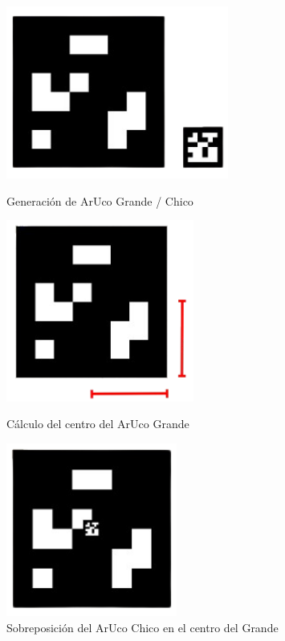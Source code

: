     \begin{figure}[h!]
        \centering
        \begin{minipage}{0.3\textwidth}
            \centering
            \includegraphics[width=0.65\textwidth]{pictures/pose_1.png}
            \caption{Generación de ArUco Grande / Chico}
            \label{fig:imagen1}
        \end{minipage}
        \hfill
        \begin{minipage}{0.3\textwidth}
            \centering
            \includegraphics[width=0.55\textwidth]{pictures/pose_2.png}
            \caption{Cálculo del centro del ArUco Grande}
            \label{fig:imagen2}
        \end{minipage}
        \hfill
        \begin{minipage}{0.3\textwidth}
            \centering
            \includegraphics[width=0.5\textwidth]{pictures/pose_3.png}
            \caption{Sobreposición del ArUco Chico en el centro del Grande}
            \label{fig:imagen2}
        \end{minipage}
    \end{figure}

